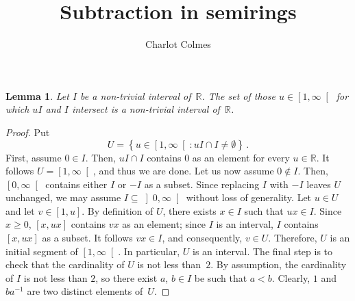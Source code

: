 \documentclass[12pt]{article}
\title{Subtraction in semirings}
\author{Charlot Colmes}
\newcommand{\bR}{\mathbb{R}}
\newcommand{\Rnneg}{\left[0, \infty\right[} %
\newcommand{\Rpos}{\left]0, \infty\right[} %
\newtheorem{lemma}{Lemma}
\theoremstyle{definition}
\begin{document}
\maketitle

\sloppy




  

\begin{lemma}
  Let $I$ be a non-trivial interval of~$\bR$.
  The set of those $u \in \left[1, \infty \right[$ for which $u I$ and $I$ intersect is a non-trivial interval of~$\bR$.
\end{lemma}

\begin{proof}
  Put
  $$
  U = \left\{ u \in \left[1, \infty \right[  : u I \cap I \ne \emptyset \right\} \,.
  $$
  First, assume $0 \in I$.
  Then, $u I \cap I$ contains $0$ as an element for every $u \in \bR$.
  It follows $U = \left[1, \infty \right[$, and thus we are done.
  Let us now assume $0 \notin I$.
  Then, $\Rnneg$ contains either $I$ or $- I$ as a subset.
  Since replacing $I$ with $- I$ leaves $U$ unchanged,
  we may assume $I \subseteq \Rpos$ without loss of generality.
  Let $u \in U$ and let $v \in [1, u]$.
  By definition of $U$, there exists $x \in I$ such that $u x \in I$.
  Since $x \ge 0$, $[x, u x]$ contains $v x$ as an element; 
  since $I$ is an interval, $I$ contains $[x, u x]$ as a subset.
  It follows $v x \in I$, and consequently, $v \in U$.
  Therefore, $U$ is an initial segment of $\left[1, \infty \right[$.
  In particular, $U$ is an interval.
  The final step is to check that the cardinality of $U$ is not less than~$2$.
  By assumption, the cardinality of $I$ is not less than $2$,
  so there exist $a$, $b \in I$ be such that $a < b$.
  Clearly, $1$ and $b a^{-1}$ are two distinct elements of~$U$.
\end{proof}
\end{document}
